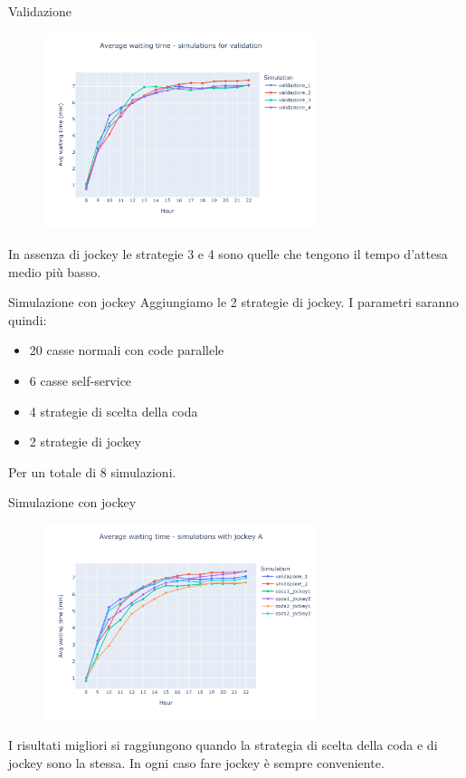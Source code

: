 \begin{frame}{Validazione}
	\begin{figure}[H]
		\centering
		\includegraphics[width=8cm]{"../report/images/results/avg_wt_validation.png"}
	\end{figure}
	In assenza di jockey le strategie 3 e 4 sono quelle che tengono il tempo d'attesa medio più basso.
\end{frame}

\begin{frame}{Simulazione con jockey}
	Aggiungiamo le 2 strategie di jockey. I parametri saranno quindi:
	\begin{itemize}
		\item 20 casse normali con code parallele
		\item 6 casse self-service
		\item 4 strategie di scelta della coda
		\item 2 strategie di jockey
	\end{itemize}
	Per un totale di 8 simulazioni.
\end{frame}

\begin{frame}{Simulazione con jockey}
	\begin{figure}[H]
		\centering
		\includegraphics[width=8cm]{"../report/images/results/avg_wt_jockey_a.png"}
	\end{figure}
	I risultati migliori si raggiungono quando la strategia di scelta della coda e di jockey sono la stessa. In ogni caso fare jockey è sempre conveniente.
\end{frame}

